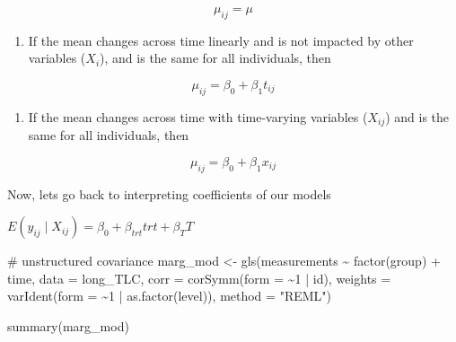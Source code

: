 \documentclass[
  letterpaper,
  DIV=11,
  numbers=noendperiod]{scrreprt}
\newenvironment{Shaded}{\begin{snugshade}}{\end{snugshade}}
\newcommand{\AttributeTok}[1]{\textcolor[rgb]{0.40,0.45,0.13}{#1}}
\newcommand{\CommentTok}[1]{\textcolor[rgb]{0.37,0.37,0.37}{#1}}
\newcommand{\DecValTok}[1]{\textcolor[rgb]{0.68,0.00,0.00}{#1}}
\newcommand{\FunctionTok}[1]{\textcolor[rgb]{0.28,0.35,0.67}{#1}}
\newcommand{\NormalTok}[1]{\textcolor[rgb]{0.00,0.23,0.31}{#1}}
\newcommand{\OtherTok}[1]{\textcolor[rgb]{0.00,0.23,0.31}{#1}}
\newcommand{\SpecialCharTok}[1]{\textcolor[rgb]{0.37,0.37,0.37}{#1}}
\newcommand{\StringTok}[1]{\textcolor[rgb]{0.13,0.47,0.30}{#1}}
\providecommand{\tightlist}{%
  \setlength{\itemsep}{0pt}\setlength{\parskip}{0pt}}\usepackage{longtable,booktabs,array}
\begin{document}
\[\mu_{ij} = \mu\]

\begin{enumerate}
\def\labelenumi{\alph{enumi})}
\setcounter{enumi}{1}
\tightlist
\item
  If the mean changes across time linearly and is not impacted by other
  variables (\(X_{i}\)), and is the same for all individuals, then
\end{enumerate}

\[\mu_{ij} = \beta_0 + \beta_1 t_{ij}\]

\begin{enumerate}
\def\labelenumi{\alph{enumi})}
\setcounter{enumi}{2}
\tightlist
\item
  If the mean changes across time with time-varying variables
  (\(X_{ij}\)) and is the same for all individuals, then
\end{enumerate}

\[\mu_{ij} = \beta_0 + \beta_1 x_{ij}\]

Now, lets go back to interpreting coefficients of our models

\begin{center}
$E(y_{ij} \mid X_{ij}) = \beta_0 +  \beta_{trt}trt +  \beta_{T}T$
\end{center}

\begin{Shaded}
\begin{Highlighting}[]
\CommentTok{\# unstructured covariance}
\NormalTok{marg\_mod }\OtherTok{\textless{}{-}} \FunctionTok{gls}\NormalTok{(measurements }\SpecialCharTok{\textasciitilde{}} \FunctionTok{factor}\NormalTok{(group) }\SpecialCharTok{+}\NormalTok{ time, }\AttributeTok{data =}\NormalTok{ long\_TLC, }\AttributeTok{corr =} \FunctionTok{corSymm}\NormalTok{(}\AttributeTok{form =} \SpecialCharTok{\textasciitilde{}}\DecValTok{1} \SpecialCharTok{|}
\NormalTok{    id), }\AttributeTok{weights =} \FunctionTok{varIdent}\NormalTok{(}\AttributeTok{form =} \SpecialCharTok{\textasciitilde{}}\DecValTok{1} \SpecialCharTok{|} \FunctionTok{as.factor}\NormalTok{(level)), }\AttributeTok{method =} \StringTok{"REML"}\NormalTok{)}

\FunctionTok{summary}\NormalTok{(marg\_mod)}
\end{Highlighting}
\end{Shaded}
\end{document}

